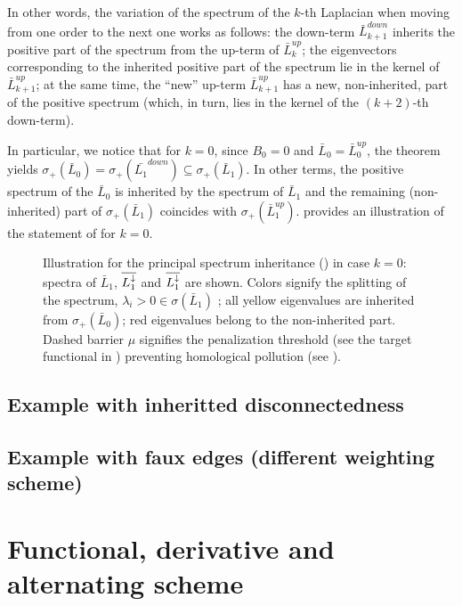 In other words, the variation of the spectrum of the $k$-th Laplacian when moving from one order to the next one works as follows: 
the down-term $\bar L_{k+1}^{down}$ inherits the positive part of the spectrum from the up-term of  $\bar L_k^{up}$; the  eigenvectors corresponding to the inherited positive part of the spectrum lie in the kernel of $\bar L_{k+1}^{up}$; at the same time, the ``new'' up-term $\bar L_{k+1}^{up}$ has a new, non-inherited, part of the positive spectrum (which, in turn, lies in the kernel of the $(k+2)$-th down-term).

In particular, we notice that for $k = 0$, since $B_0=0$ and $\bar L_0=\bar L_0^{up}$, the  theorem yields $\sigma_+ (\bar L_0 ) = \sigma_+ (\bar{L_1}^{down}) \subseteq \sigma_+(\bar L_1)$. In other terms, the positive spectrum of the $\bar L_0$ is inherited by the spectrum of $\bar L_1$ and the remaining (non-inherited) part of $\sigma_+(\bar L_1)$ coincides with $\sigma_+(\bar L_1^{up})$. 
 provides an  illustration of the statement of   for $k = 0$.
  \begin{figure}[t]
    \centering
    
    \caption{Illustration for the principal spectrum inheritance () in case $k=0$: spectra of $\bar L_1$, $\overline{L_{1}^{\downarrow}}$ and $\overline{L_{1}^{\downarrow}}$ are shown. Colors signify the splitting of the spectrum, $\lambda_i>0 \in \sigma(\bar L_1)$ ; all yellow eigenvalues are inherited from $\sigma_+(\bar L_0)$; red eigenvalues belong to the non-inherited part. Dashed barrier $\mu$ signifies the penalization threshold (see the target functional in ) preventing homological pollution (see ). }
    \label{fig:thm_spct_ill}
    \vspace{-10pt}
  \end{figure}


\subsection{ Example with inheritted disconnectedness }



\subsection{ Example with faux edges (different weighting scheme) }





\section{ Functional, derivative and alternating scheme }

